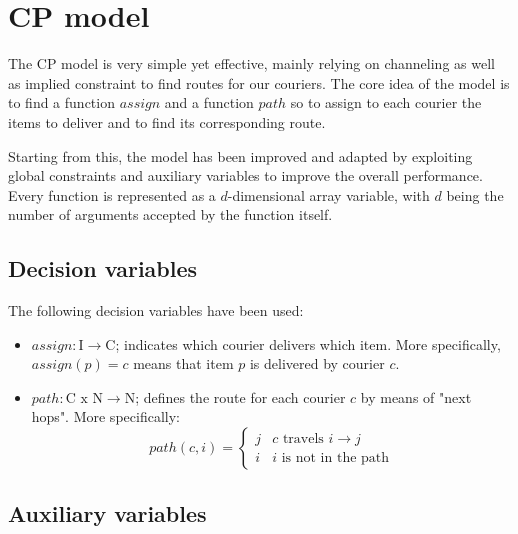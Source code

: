 \section{CP model}

The CP model is very simple yet effective, mainly relying on channeling as well as implied constraint to find routes for our couriers. The core idea of the model is to find a function $assign$ and a function $path$ so to assign to each courier the items to deliver and to find its corresponding route. 

Starting from this, the model has been improved and adapted by exploiting global constraints and auxiliary variables to improve the overall performance. Every function is represented as a $d$-dimensional array variable, with $d$ being the number of arguments accepted by the function itself.

\subsection{Decision variables}

The following decision variables have been used:
\begin{itemize}
    \item $assign : \text{I} \to \text{C}$;  indicates which courier delivers which item. More specifically, $assign(p) = c$ means that item $p$ is delivered by courier $c$.
    
    \item $path : \text{C x N} \to \text{N}$;   defines the route for each courier $c$ by means of "next hops". More specifically:
    \begin{equation}
    \label{eq:path}
    path(c,i) =
    \begin{cases}
        j    & \text{$c$ travels $i \to j$} \\
        i  & \text{$i$ is not in the path} 
    \end{cases}
    \end{equation}
\end{itemize}

\subsection{Auxiliary variables}

